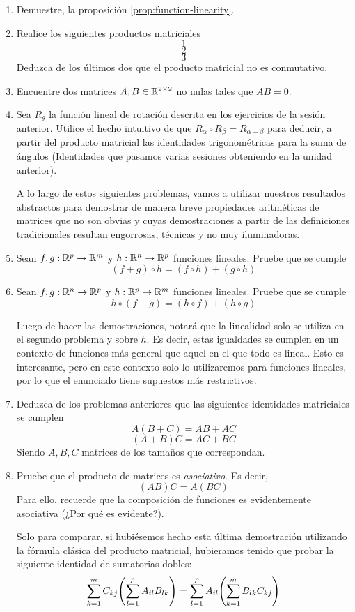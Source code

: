 \begin{enumerate}
    \item Demuestre, la proposición \ref{prop:function-linearity}.
    \item Realice los siguientes productos matriciales
        \[1\]
        \[2\]
        \[3\]
        Deduzca de los últimos dos que el producto matricial no es conmutativo.
    \item Encuentre dos matrices $A, B \in \mathbb{R}^{2 \times 2}$ no nulas tales que $AB = 0$.
    \item Sea $R_\theta$ la función lineal de rotación descrita en los ejercicios de la sesión anterior. Utilice el hecho intuitivo de que $R_{\alpha} \circ R_{\beta} = R_{\alpha + \beta}$ para deducir, a partir del producto matricial las identidades trigonométricas para la suma de ángulos (Identidades que pasamos varias sesiones obteniendo en la unidad anterior).
    
    A lo largo de estos siguientes problemas, vamos a utilizar nuestros resultados abstractos para demostrar de manera breve propiedades aritméticas de matrices que no son obvias y cuyas demostraciones a partir de las definiciones tradicionales resultan engorrosas, técnicas y no muy iluminadoras.
    \item Sean $f, g : \mathbb{R}^p \to \mathbb{R}^m$ y $h: \mathbb{R}^n \to \mathbb{R}^p$ funciones lineales. Pruebe que se cumple
    \[(f + g) \circ h = (f \circ h) + (g \circ h)\]
    \item  Sean $f, g : \mathbb{R}^n \to \mathbb{R}^p$ y $h: \mathbb{R}^p \to \mathbb{R}^m$ funciones lineales. Pruebe que se cumple
    \[h \circ(f + g) = (h \circ f) + (h \circ g)\]

    \begin{remark}
        Luego de hacer las demostraciones, notará que la linealidad solo se utiliza en el segundo problema y sobre $h$. Es decir, estas igualdades se cumplen en un contexto de funciones más general que aquel en el que todo es lineal. Esto es interesante, pero en este contexto solo lo utilizaremos para funciones lineales, por lo que el enunciado tiene supuestos más restrictivos.
    \end{remark}
    \item Deduzca de los problemas anteriores que las siguientes identidades matriciales se cumplen
    \[A(B + C) = AB + AC\]
    \[(A + B)C = AC + BC\]
    Siendo $A, B, C$ matrices de los tamaños que correspondan.

    \item Pruebe que el producto de matrices es \textit{asociativo}. Es decir,
    \[(AB)C = A(BC)\]
    Para ello, recuerde que la composición de funciones es evidentemente asociativa (¿Por qué es evidente?).
    \begin{remark}
        Solo para comparar, si hubiésemos hecho esta última demostración utilizando la fórmula clásica del producto matricial, hubieramos tenido que probar la siguiente identidad de sumatorias dobles:
        \[\sum_{k=1}^m C_{kj}\qty(\sum_{l=1}^p A_{il}B_{lk}) = \sum_{l=1}^p A_{il} \qty(\sum_{k=1}^m B_{lk}C_{kj})\]
    \end{remark}

\end{enumerate}